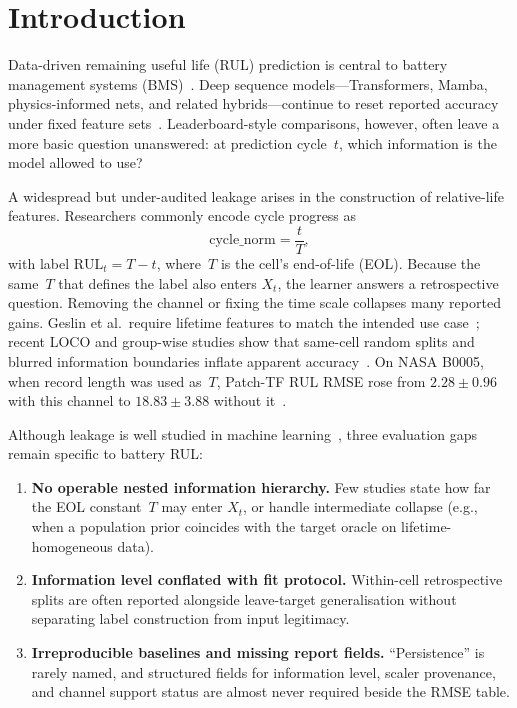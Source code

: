 \documentclass[preprint,12pt]{elsarticle}
\begin{document}
\section{Introduction}
\label{sec:intro}

Data-driven remaining useful life (RUL) prediction is central to battery management systems (BMS)~\cite{hu2019rser,xiong2018soh}.
Deep sequence models---Transformers, Mamba, physics-informed nets, and related hybrids---continue to reset reported accuracy under fixed feature sets~\cite{lipu2018,wang2024gce,xu2025meas,yang2025batteries,zhang2025batlinet,deng2025piml,huang2025rulmamba,sun2026sgdits}.
Leaderboard-style comparisons, however, often leave a more basic question unanswered: at prediction cycle~$t$, which information is the model allowed to use?

A widespread but under-audited leakage arises in the construction of relative-life features.
Researchers commonly encode cycle progress as
\begin{equation}
\mathrm{cycle\_norm}=\frac{t}{T},
\end{equation}
with label $\mathrm{RUL}_t=T-t$, where~$T$ is the cell's end-of-life (EOL).
Because the same~$T$ that defines the label also enters $X_t$, the learner answers a retrospective question.
Removing the channel or fixing the time scale collapses many reported gains.
Geslin et al.\ require lifetime features to match the intended use case~\cite{geslin2023joule}; recent LOCO and group-wise studies show that same-cell random splits and blurred information boundaries inflate apparent accuracy~\cite{ali2026loco,barua2026predictor,madani2025groupkfold}.
On NASA B0005, when record length was used as~$T$, Patch-TF RUL RMSE rose from $2.28\pm0.96$ with this channel to $18.83\pm3.88$ without it~\cite{saha2007nasa}.

Although leakage is well studied in machine learning~\cite{kaufman2012leakage,kapoor2023leakage}, three evaluation gaps remain specific to battery RUL:
\begin{enumerate}
\item \textbf{No operable nested information hierarchy.}
Few studies state how far the EOL constant~$T$ may enter $X_t$, or handle intermediate collapse (e.g., when a population prior coincides with the target oracle on lifetime-homogeneous data).
\item \textbf{Information level conflated with fit protocol.}
Within-cell retrospective splits are often reported alongside leave-target generalisation without separating label construction from input legitimacy.
\item \textbf{Irreproducible baselines and missing report fields.}
``Persistence'' is rarely named, and structured fields for information level, scaler provenance, and channel support status are almost never required beside the RMSE table.
\end{enumerate}
\end{document}
